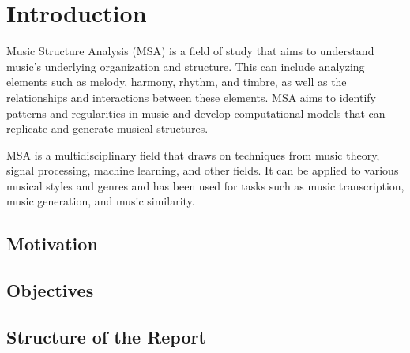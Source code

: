 \normallinespacing

\chapter{Introduction}

Music Structure Analysis (MSA) is a field of study that aims to understand music's underlying organization and structure. This can include analyzing elements such as melody, harmony, rhythm, and timbre, as well as the relationships and interactions between these elements. MSA aims to identify patterns and regularities in music and develop computational models that can replicate and generate musical structures.

MSA is a multidisciplinary field that draws on techniques from music theory, signal processing, machine learning, and other fields. It can be applied to various musical styles and genres and has been used for tasks such as music transcription, music generation, and music similarity. \cite{rodriguez2005bilateral}
\section{Motivation}

\section{Objectives}
\section{Structure of the Report}


\newpage


